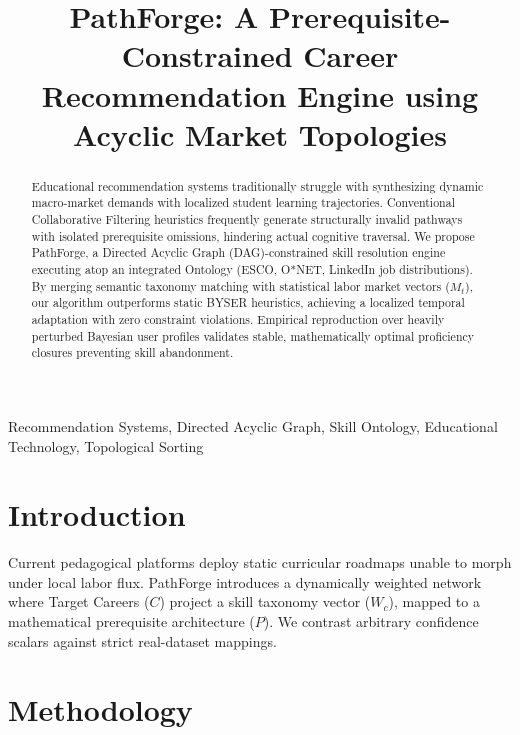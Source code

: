 \documentclass[conference]{IEEEtran}
\begin{document}
\title{PathForge: A Prerequisite-Constrained Career Recommendation Engine using Acyclic Market Topologies\\
}

\author{
}

\maketitle

\begin{abstract}
Educational recommendation systems traditionally struggle with synthesizing dynamic macro-market demands with localized student learning trajectories. Conventional Collaborative Filtering heuristics frequently generate structurally invalid pathways with isolated prerequisite omissions, hindering actual cognitive traversal. We propose PathForge, a Directed Acyclic Graph (DAG)-constrained skill resolution engine executing atop an integrated Ontology (ESCO, O*NET, LinkedIn job distributions). By merging semantic taxonomy matching with statistical labor market vectors ($M_t$), our algorithm outperforms static BYSER heuristics, achieving a localized temporal adaptation with zero constraint violations. Empirical reproduction over heavily perturbed Bayesian user profiles validates stable, mathematically optimal proficiency closures preventing skill abandonment.
\end{abstract}

\begin{IEEEkeywords}
Recommendation Systems, Directed Acyclic Graph, Skill Ontology, Educational Technology, Topological Sorting
\end{IEEEkeywords}

\section{Introduction}
Current pedagogical platforms deploy static curricular roadmaps unable to morph under local labor flux. PathForge introduces a dynamically weighted network where Target Careers ($C$) project a skill taxonomy vector ($W_c$), mapped to a mathematical prerequisite architecture ($P$). We contrast arbitrary confidence scalars against strict real-dataset mappings.

\section{Methodology}
\end{document}
